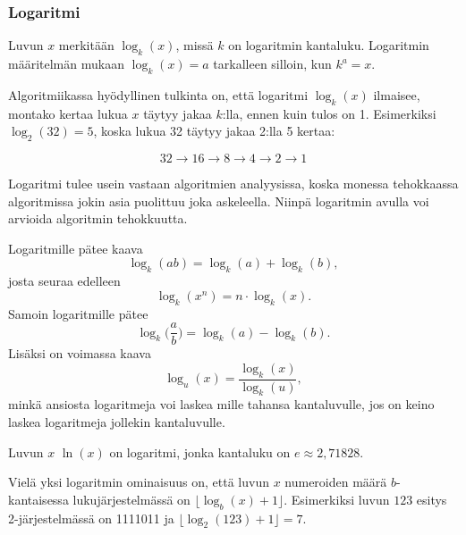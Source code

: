 \subsubsection{Logaritmi}


Luvun $x$
 merkitään $\log_k(x)$, missä $k$ on logaritmin kantaluku.
Logaritmin määritelmän mukaan
$\log_k(x)=a$ tarkalleen silloin, kun $k^a=x$.

Algoritmiikassa hyödyllinen tulkinta on,
että logaritmi $\log_k(x)$ ilmaisee, montako kertaa lukua $x$
täytyy jakaa $k$:lla, ennen kuin tulos on 1.
Esimerkiksi $\log_2(32)=5$,
koska lukua 32 täytyy jakaa 2:lla 5 kertaa:

\[32 \rightarrow 16 \rightarrow 8 \rightarrow 4 \rightarrow 2 \rightarrow 1 \]

Logaritmi tulee usein vastaan algoritmien analyysissa,
koska monessa tehokkaassa algoritmissa jokin asia puolittuu
joka askeleella.
Niinpä logaritmin avulla voi arvioida algoritmin tehokkuutta.

Logaritmille pätee kaava
\[\log_k(ab) = \log_k(a)+\log_k(b),\]
josta seuraa edelleen
\[\log_k(x^n) = n \cdot \log_k(x).\]
Samoin logaritmille pätee
\[\log_k\Big(\frac{a}{b}\Big) = \log_k(a)-\log_k(b).\]
Lisäksi on voimassa kaava
\[\log_u(x) = \frac{\log_k(x)}{\log_k(u)},\]
minkä ansiosta logaritmeja voi laskea mille tahansa kantaluvulle,
jos on keino laskea logaritmeja jollekin kantaluvulle.


Luvun $x$  $\ln(x)$ on logaritmi, jonka kantaluku on
 $e \approx 2{,}71828$.

Vielä yksi logaritmin ominaisuus on, että
luvun $x$ numeroiden määrä $b$-kantaisessa
lukujärjestelmässä
on $\lfloor \log_b(x)+1 \rfloor$.
Esimerkiksi luvun $123$ esitys
2-järjestelmässä on 1111011 ja
$\lfloor \log_2(123)+1 \rfloor = 7$.

